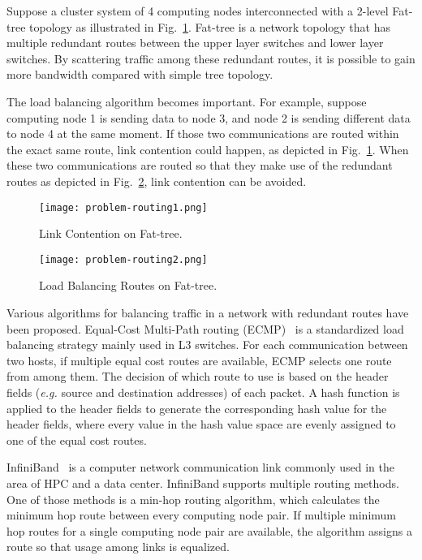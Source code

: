 Suppose a cluster system of 4 computing nodes interconnected with a
2-level Fat-tree topology as illustrated in Fig.~\ref{fig-problem-routing1}.
Fat-tree is a network topology that has multiple redundant routes between the
upper layer switches and lower layer switches. By scattering traffic among
these redundant routes, it is possible to gain more bandwidth compared with
simple tree topology.

The load balancing algorithm becomes important. For example, suppose
computing node 1 is sending data to node 3, and node 2 is sending
different data to node 4 at the same moment. If those two communications
are routed within the exact same route, link contention could happen, as
depicted in Fig.~\ref{fig-problem-routing1}. When these two
communications are routed so that they make use of the redundant routes
as depicted in Fig.~\ref{fig-problem-routing2}, link contention can be
avoided.

\begin{figure}
    \centering
    \texttt{[image: problem-routing1.png]}
    \caption{Link Contention on Fat-tree.}%
    \label{fig-problem-routing1}
\end{figure}

\begin{figure}
    \centering
    \texttt{[image: problem-routing2.png]}
    \caption{Load Balancing Routes on Fat-tree.}%
    \label{fig-problem-routing2}
\end{figure}

Various algorithms for balancing traffic in a network with redundant
routes have been proposed. Equal-Cost Multi-Path routing (ECMP)~\autocite{ecmp} is
a standardized load balancing strategy mainly used in L3 switches. For each
communication between two hosts, if multiple equal cost routes are available,
ECMP selects one route from among them. The decision of which route to use is
based on the header fields (\emph{e.g.} source and destination addresses) of
each packet. A hash function is applied to the header fields to generate the
corresponding hash value for the header fields, where every value in the hash
value space are evenly assigned to one of the equal cost routes.

InfiniBand~\autocite{infiniband} is a computer network communication link
commonly used in the area of HPC and a data center. InfiniBand supports
multiple routing methods. One of those methods is a min-hop routing
algorithm, which calculates the minimum hop route between every
computing node pair. If multiple minimum hop routes for a single
computing node pair are available, the algorithm assigns a route so that
usage among links is equalized.

